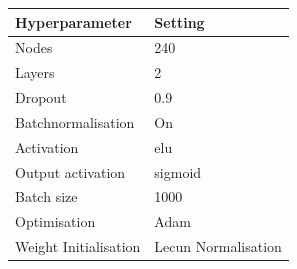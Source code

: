 \begin{frame}
    \begin{table}[]
    \begin{tabular}{|l|l|}
    \hline
    Hyperparameter          & Setting             \\ \hline
    Nodes                   & 240                 \\ \hline
    Layers                  & 2                   \\ \hline
    Dropout                 & 0.9                 \\ \hline
    Batchnormalisation       & On                  \\ \hline
    Activation              & elu                 \\ \hline
    Output activation       & sigmoid             \\ \hline
    Batch size              & 1000                \\ \hline
    Optimisation            & Adam                \\ \hline
    Weight Initialisation   & Lecun Normalisation \\ \hline
    \end{tabular}
    \end{table}
\end{frame}

